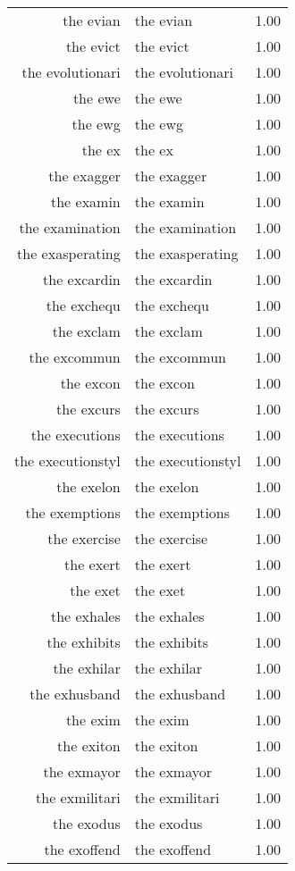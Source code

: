 \begin{table}[ht]
\begin{tabular}{rlr}
  the evian & the evian & 1.00 \\ 
  the evict & the evict & 1.00 \\ 
  the evolutionari & the evolutionari & 1.00 \\ 
  the ewe & the ewe & 1.00 \\ 
  the ewg & the ewg & 1.00 \\ 
  the ex & the ex & 1.00 \\ 
  the exagger & the exagger & 1.00 \\ 
  the examin & the examin & 1.00 \\ 
  the examination & the examination & 1.00 \\ 
  the exasperating & the exasperating & 1.00 \\ 
  the excardin & the excardin & 1.00 \\ 
  the exchequ & the exchequ & 1.00 \\ 
  the exclam & the exclam & 1.00 \\ 
  the excommun & the excommun & 1.00 \\ 
  the excon & the excon & 1.00 \\ 
  the excurs & the excurs & 1.00 \\ 
  the executions & the executions & 1.00 \\ 
  the executionstyl & the executionstyl & 1.00 \\ 
  the exelon & the exelon & 1.00 \\ 
  the exemptions & the exemptions & 1.00 \\ 
  the exercise & the exercise & 1.00 \\ 
  the exert & the exert & 1.00 \\ 
  the exet & the exet & 1.00 \\ 
  the exhales & the exhales & 1.00 \\ 
  the exhibits & the exhibits & 1.00 \\ 
  the exhilar & the exhilar & 1.00 \\ 
  the exhusband & the exhusband & 1.00 \\ 
  the exim & the exim & 1.00 \\ 
  the exiton & the exiton & 1.00 \\ 
  the exmayor & the exmayor & 1.00 \\ 
  the exmilitari & the exmilitari & 1.00 \\ 
  the exodus & the exodus & 1.00 \\ 
  the exoffend & the exoffend & 1.00 \\ 

\end{tabular}
\end{table}
